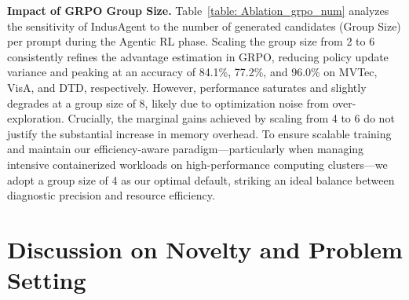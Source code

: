\documentclass{article}
\begin{document}
{\begin{table}
\vspace{-1.5em} %
\centering
\caption{Ablation on the number of generated candidates per prompt.}
\label{table: Ablation_grpo_num}
\vspace{-1.0em} %
\end{table}

\newpage

\textbf{Impact of GRPO Group Size.} Table~\ref{table: Ablation_grpo_num} analyzes the sensitivity of IndusAgent to the number of generated candidates (Group Size) per prompt during the Agentic RL phase. Scaling the group size from 2 to 6 consistently refines the advantage estimation in GRPO, reducing policy update variance and peaking at an accuracy of 84.1\%, 77.2\%, and 96.0\% on MVTec, VisA, and DTD, respectively. However, performance saturates and slightly degrades at a group size of 8, likely due to optimization noise from over-exploration. Crucially, the marginal gains achieved by scaling from 4 to 6 do not justify the substantial increase in memory overhead. To ensure scalable training and maintain our efficiency-aware paradigm---particularly when managing intensive containerized workloads on high-performance computing clusters---we adopt a group size of 4 as our optimal default, striking an ideal balance between diagnostic precision and resource efficiency.



\section{Discussion on Novelty and Problem Setting}
\label{appx:discussion_novelty}

}
\end{document}
